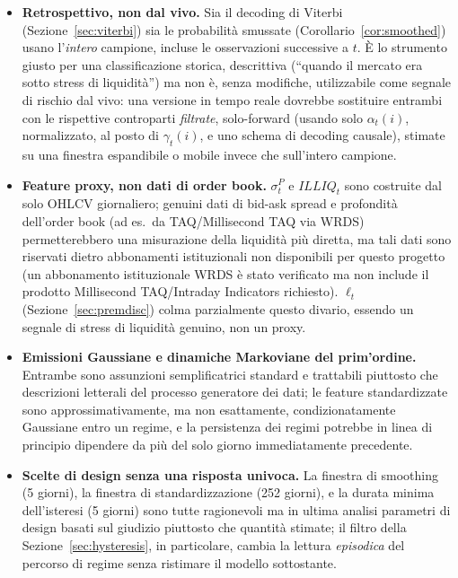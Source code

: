 \documentclass[11pt]{article}
\theoremstyle{definition}
\theoremstyle{remark}
\begin{document}
\begin{itemize}
    \item \textbf{Retrospettivo, non dal vivo.} Sia il decoding di Viterbi (Sezione~\ref{sec:viterbi}) sia le probabilit\`a smussate (Corollario~\ref{cor:smoothed}) usano l'\emph{intero} campione, incluse le osservazioni successive a $t$. \`E lo strumento giusto per una classificazione storica, descrittiva (``quando il mercato era sotto stress di liquidit\`a'') ma non \`e, senza modifiche, utilizzabile come segnale di rischio dal vivo: una versione in tempo reale dovrebbe sostituire entrambi con le rispettive controparti \emph{filtrate}, solo-forward (usando solo $\alpha_t(i)$, normalizzato, al posto di $\gamma_t(i)$, e uno schema di decoding causale), stimate su una finestra espandibile o mobile invece che sull'intero campione.
    \item \textbf{Feature proxy, non dati di order book.} $\sigma^P_t$ e $ILLIQ_t$ sono costruite dal solo OHLCV giornaliero; genuini dati di bid-ask spread e profondit\`a dell'order book (ad es.\ da TAQ/Millisecond TAQ via WRDS) permetterebbero una misurazione della liquidit\`a pi\`u diretta, ma tali dati sono riservati dietro abbonamenti istituzionali non disponibili per questo progetto (un abbonamento istituzionale WRDS \`e stato verificato ma non include il prodotto Millisecond TAQ/Intraday Indicators richiesto). $\ell_t$ (Sezione~\ref{sec:premdisc}) colma parzialmente questo divario, essendo un segnale di stress di liquidit\`a genuino, non un proxy.
    \item \textbf{Emissioni Gaussiane e dinamiche Markoviane del prim'ordine.} Entrambe sono assunzioni semplificatrici standard e trattabili piuttosto che descrizioni letterali del processo generatore dei dati; le feature standardizzate sono approssimativamente, ma non esattamente, condizionatamente Gaussiane entro un regime, e la persistenza dei regimi potrebbe in linea di principio dipendere da pi\`u del solo giorno immediatamente precedente.
    \item \textbf{Scelte di design senza una risposta univoca.} La finestra di smoothing (5 giorni), la finestra di standardizzazione (252 giorni), e la durata minima dell'isteresi (5 giorni) sono tutte ragionevoli ma in ultima analisi parametri di design basati sul giudizio piuttosto che quantit\`a stimate; il filtro della Sezione~\ref{sec:hysteresis}, in particolare, cambia la lettura \emph{episodica} del percorso di regime senza ristimare il modello sottostante.

\end{itemize}
\end{document}
